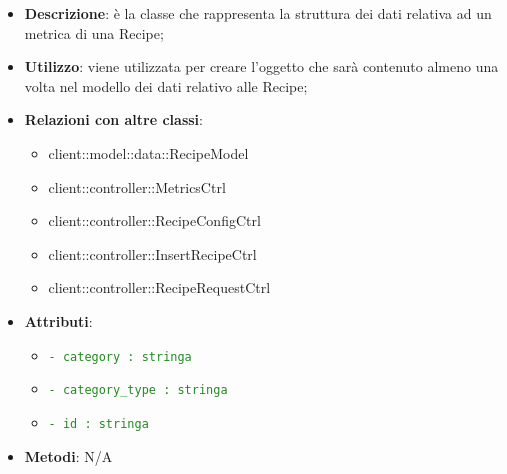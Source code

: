 			\begin{itemize}
				\item \textbf{Descrizione}: è la classe che rappresenta la struttura dei dati relativa ad un metrica di una Recipe;
				\item \textbf{Utilizzo}: viene utilizzata per creare l'oggetto che sarà contenuto almeno una volta nel modello dei dati relativo alle Recipe;
				\item \textbf{Relazioni con altre classi}:
					\begin{itemize}
						\item client::model::data::RecipeModel
						\item client::controller::MetricsCtrl
						\item client::controller::RecipeConfigCtrl
						\item client::controller::InsertRecipeCtrl
						\item client::controller::RecipeRequestCtrl
					\end{itemize}
				\item \textbf{Attributi}:
					\begin{itemize}
						\item \textcolor{forestgreen}{\texttt{- category : stringa}}
						\item \textcolor{forestgreen}{\texttt{- category\_type : stringa}}
						\item \textcolor{forestgreen}{\texttt{- id : stringa}}
					\end{itemize}
				\item \textbf{Metodi}: N/A
			\end{itemize}

